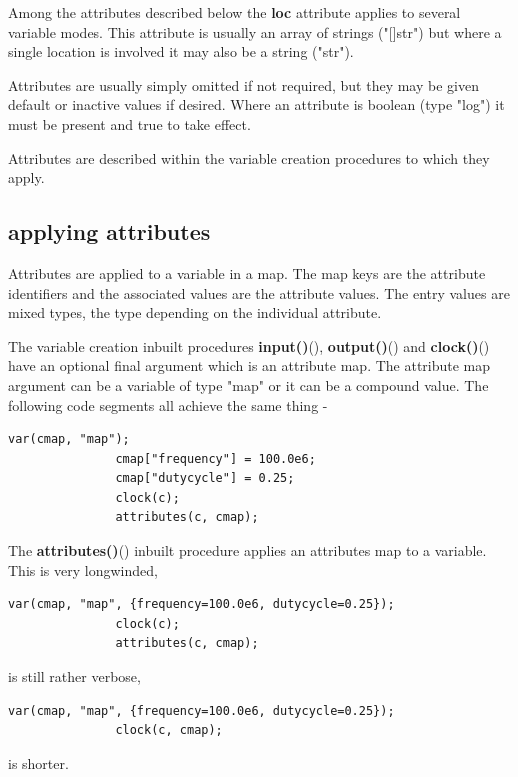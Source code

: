         Among the attributes described below the {\bf loc} attribute applies
        to several variable modes. This attribute is usually an array of
        strings ("[]str") but where a single location is involved it may also
        be a string ("str").

        Attributes are usually simply omitted if not required, but they
        may be given default or inactive values if desired.
        Where an attribute is boolean (type "log") it must be present and
        true to take effect.      
        
        Attributes are described within the variable creation procedures to
        which they apply.
        
        \subsection{applying attributes}
        
            Attributes are applied to a variable in a map. The map
            keys are the attribute identifiers and the associated values
            are the attribute values. The entry values are mixed types,
            the type depending on the individual attribute.
            
            The variable creation inbuilt procedures
            {\bf input()}(),
            {\bf output()}() and
            {\bf clock()}()
            have an optional final argument which is an attribute map.
            The attribute map argument can be a variable of type "map"
            or it can be a compound value. The following code
            segments all achieve the same thing -

            \begin{lstlisting}[gobble=12, language=threepl]
               var(cmap, "map");
               cmap["frequency"] = 100.0e6;
               cmap["dutycycle"] = 0.25;
               clock(c);
               attributes(c, cmap);
            \end{lstlisting}
            The {\bf attributes()}() inbuilt
            procedure applies an attributes map to a variable.
            This is very longwinded,
            \begin{lstlisting}[gobble=12, language=threepl]
               var(cmap, "map", {frequency=100.0e6, dutycycle=0.25});
               clock(c);
               attributes(c, cmap);
            \end{lstlisting}
            is still rather verbose,
            \begin{lstlisting}[gobble=12, language=threepl]
               var(cmap, "map", {frequency=100.0e6, dutycycle=0.25});
               clock(c, cmap);
            \end{lstlisting}
            is shorter.
            
